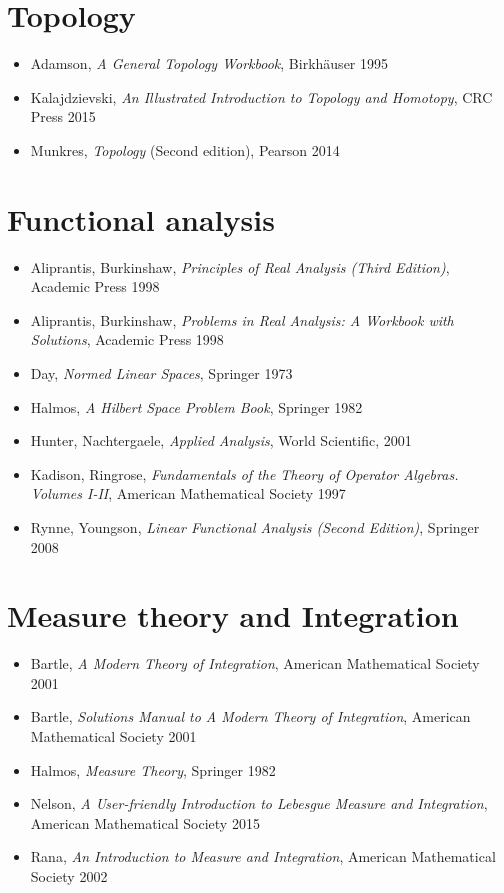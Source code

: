 \section*{Topology}

\begin{itemize}
\item Adamson, \textit{A General Topology Workbook}, Birkh\"auser 1995
\item Kalajdzievski, \textit{An Illustrated Introduction to Topology and Homotopy}, CRC Press 2015
\item Munkres, \textit{Topology} (Second edition), Pearson 2014
\end{itemize}


\section*{Functional analysis}

\begin{itemize}
\item Aliprantis, Burkinshaw, \textit{Principles of Real Analysis (Third Edition)}, Academic Press 1998
\item Aliprantis, Burkinshaw, \textit{Problems in Real Analysis: A Workbook with Solutions}, Academic Press 1998
\item Day, \textit{Normed Linear Spaces}, Springer 1973
\item Halmos, \textit{A Hilbert Space Problem Book}, Springer 1982
\item Hunter, Nachtergaele, \textit{Applied Analysis}, World Scientific, 2001
\item Kadison, Ringrose, \textit{Fundamentals of the Theory of Operator Algebras. Volumes I-II}, American Mathematical Society 1997
\item Rynne, Youngson, \textit{Linear Functional Analysis (Second Edition)}, Springer 2008
\end{itemize}


\section*{Measure theory and Integration}

\begin{itemize}
\item Bartle, \textit{A Modern Theory of Integration}, American Mathematical Society 2001
\item Bartle, \textit{Solutions Manual to A Modern Theory of Integration}, American Mathematical Society 2001
\item Halmos, \textit{Measure Theory}, Springer 1982
\item Nelson, \textit{A User-friendly Introduction to Lebesgue Measure and Integration}, American Mathematical Society 2015
\item Rana, \textit{An Introduction to Measure and Integration}, American Mathematical Society 2002
\end{itemize}





